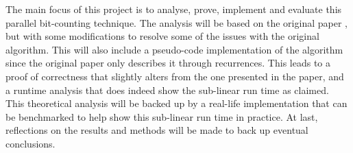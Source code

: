The main focus of this project is to analyse, prove, implement and evaluate this parallel bit-counting technique. The analysis will be based on the original paper \cite{fast-similarity-search}, but with some modifications to resolve some of the issues with the original algorithm. This will also include a pseudo-code implementation of the algorithm since the original paper only describes it through recurrences. This leads to a proof of correctness that slightly alters from the one presented in the paper, and a runtime analysis that does indeed show the sub-linear run time as claimed.\\
This theoretical analysis will be backed up by a real-life implementation that can be benchmarked to help show this sub-linear run time in practice. At last, reflections on the results and methods will be made to back up eventual conclusions.

